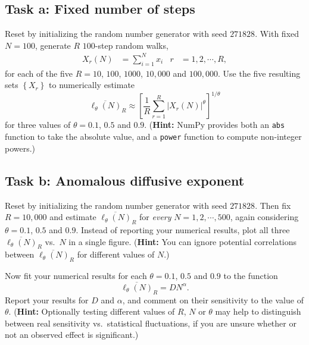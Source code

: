 \documentclass[12 pt]{article} %
\newcommand{\al}{\ensuremath{\alpha} }
\newcommand{\showmarks}[1]{\rightline{\texttt{[#1 marks]}}} %
\begin{document}
\subsection*{Task a: Fixed number of steps}
Reset by initializing the random number generator with seed $271828$.
With fixed $N = 100$, generate $R$ $100$-step random walks,
\begin{align*}
  X_r(N) & = \sum_{i = 1}^N x_i &
  r & = 1, 2, \cdots, R,
\end{align*}
for each of the five $R = 10$, $100$, $1000$, $10{,}000$ and $100{,}000$.
Use the five resulting sets $\left\{X_r\right\}$ to numerically estimate
\begin{equation*}
  \overline{\ell_{\theta}(N)}_R \approx \left[\frac{1}{R} \sum_{r = 1}^R \left|X_r(N)\right|^{\theta}\right]^{1 / \theta}
\end{equation*}
for three values of $\theta = 0.1$, $0.5$ and $0.9$.
(\textbf{Hint:} NumPy provides both an \texttt{abs} function to take the absolute value, and a \texttt{power} function to compute non-integer powers.)

\showmarks{12}

\subsection*{Task b: Anomalous diffusive exponent}
Reset by initializing the random number generator with seed $271828$.
Then fix $R = 10{,}000$ and estimate $\overline{\ell_{\theta}(N)}_R$ for \textit{every} $N = 1, 2, \cdots, 500$, again considering $\theta = 0.1$, $0.5$ and $0.9$.
Instead of reporting your numerical results, plot all three $\overline{\ell_{\theta}(N)}_R$ vs.\ $N$ in a single figure.
(\textbf{Hint:} You can ignore potential correlations between $\overline{\ell_{\theta}(N)}_R$ for different values of $N$.)

\showmarks{8}

Now fit your numerical results for each $\theta = 0.1$, $0.5$ and $0.9$ to the function
\begin{equation*}
  \overline{\ell_{\theta}(N)}_R = D N^{\al}.
\end{equation*}
Report your results for $D$ and $\al$, and comment on their sensitivity to the value of $\theta$.
(\textbf{Hint:} Optionally testing different values of $R$, $N$ or $\theta$ may help to distinguish between real sensitivity vs.\ statistical fluctuations, if you are unsure whether or not an observed effect is significant.)

\showmarks{10}



\end{document}

